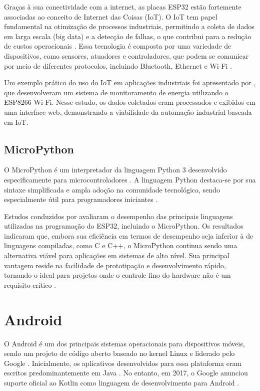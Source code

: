 Graças à sua conectividade com a internet, as placas ESP32 estão fortemente associadas ao conceito de Internet das Coisas (IoT). O IoT tem papel fundamental na otimização de processos industriais, permitindo a coleta de dados em larga escala (big data) e a detecção de falhas, o que contribui para a redução de custos operacionais \cite{ferencz2020rapid}. Essa tecnologia é composta por uma variedade de dispositivos, como sensores, atuadores e controladores, que podem se comunicar por meio de diferentes protocolos, incluindo Bluetooth, Ethernet e Wi-Fi \cite{shinde2017industrial}.

Um exemplo prático do uso do IoT em aplicações industriais foi apresentado por , que desenvolveram um sistema de monitoramento de energia utilizando o ESP8266 Wi-Fi. Nesse estudo, os dados coletados eram processados e exibidos em uma interface web, demonstrando a viabilidade da automação industrial baseada em IoT.


\subsection{MicroPython}

O MicroPython é um interpretador da linguagem Python 3 desenvolvido especificamente para microcontroladores \cite{PLAUSKA2022}. A linguagem Python destaca-se por sua sintaxe simplificada e ampla adoção na comunidade tecnológica, sendo especialmente útil para programadores iniciantes \cite{TOLLERVEY2017}.

Estudos conduzidos por  avaliaram o desempenho das principais linguagens utilizadas na programação do ESP32, incluindo o MicroPython. Os resultados indicaram que, embora sua eficiência em termos de desempenho seja inferior à de linguagens compiladas, como C e C++, o MicroPython continua sendo uma alternativa viável para aplicações em sistemas de alto nível. Sua principal vantagem reside na facilidade de prototipação e desenvolvimento rápido, tornando-o ideal para projetos onde o controle fino do hardware não é um requisito crítico \cite{tanganelli2019rapid}.



\section{Android}

O Android é um dos principais sistemas operacionais para dispositivos móveis, sendo um projeto de código aberto baseado no kernel Linux e liderado pelo Google \cite{ABLESON2011}. Inicialmente, os aplicativos desenvolvidos para essa plataforma eram escritos predominantemente em Java \cite{ABLESON2011}. No entanto, em 2017, o Google anunciou suporte oficial ao Kotlin como linguagem de desenvolvimento para Android \cite{SILLS2023}.

